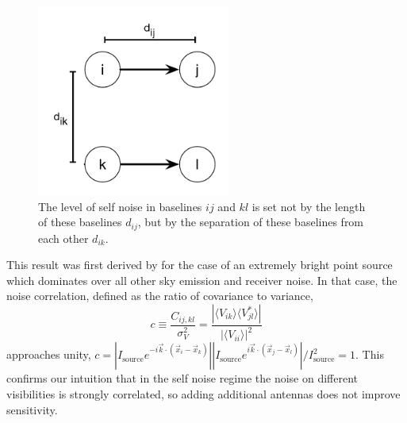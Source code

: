 \begin{figure}[t]
\centering
\includegraphics[width=2.5in]{skynoise/array2by2.pdf}
\caption[The level of self noise in baselines is set by their separation.]{The level of self noise in baselines $ij$ and $kl$ is set not by the length of these baselines $d_{ij}$, but by the separation of these baselines from each other $d_{ik}$. }
\label{fig:array2by2}
\end{figure}

This result was first derived by \citet{kulkarni89} for the case of an extremely bright point source which dominates over all other sky emission and receiver noise. In that case, the noise correlation, defined as the ratio of covariance to variance, 
\begin{equation}
\label{eqn:noisecorr}
c \equiv \frac{C_{ij,kl}}{\sigma_V^2}=\frac{|\langle V_{ik}\rangle\langle V_{jl}^*\rangle|}{|\langle V_{ii}\rangle|^2}
\end{equation}
approaches unity, $c=|I_\text{source}e^{-i\vec{k}\cdot(\vec{x}_i-\vec{x}_k)}||I_\text{source}e^{i\vec{k}\cdot(\vec{x}_j-\vec{x}_l)}|/I_\text{source}^2=1$. 
This confirms our intuition that in the self noise regime the noise on different visibilities is strongly correlated, so adding additional antennas does not improve sensitivity. 

